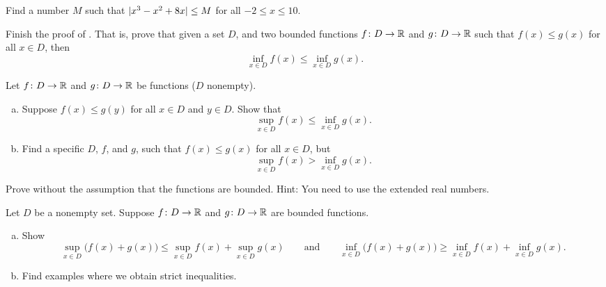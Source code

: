 \begin{exercise}
Find a number $M$ such that $\lvert {x^3-x^2+8x} \rvert \leq M$ for all $-2 \leq x \leq
10$.
\end{exercise}

\begin{exercise} \label{exercise:finishfuncsupinf}
Finish the proof of .
That is, prove that
given a set $D$,
and two bounded functions
$f \colon D \to {\mathbb{R}}$ and $g \colon D \to {\mathbb{R}}$ 
such that $f(x) \leq g(x)$ for all $x \in D$, then 
\begin{equation*}
\inf_{x\in D} f(x) \leq \inf_{x\in D} g(x) .
\end{equation*}
\end{exercise}

\begin{exercise} \label{exercise:supinffuncineq}
Let 
$f \colon D \to {\mathbb{R}}$ and $g \colon D \to {\mathbb{R}}$ be functions ($D$ nonempty).
\begin{enumerate}[a)]
%
\item
Suppose 
$f(x) \leq g(y)$ for all $x \in D$ and $y \in D$.  Show that
\begin{equation*}
\sup_{x\in D} f(x) \leq \inf_{x\in D} g(x) .
\end{equation*}
%
\item
Find a specific $D$, $f$, and $g$, such that
$f(x) \leq g(x)$ for all $x \in D$, but
\begin{equation*}
\sup_{x\in D} f(x) > \inf_{x\in D} g(x) .
\end{equation*}
\end{enumerate}
\end{exercise}

\begin{exercise}
Prove  without the assumption that
the functions are bounded.  Hint: You need to use the extended real
numbers.
\end{exercise}

\begin{exercise} \label{exercise:sumofsup}
Let $D$ be a nonempty set.
Suppose $f \colon D \to {\mathbb{R}}$ and $g \colon D \to {\mathbb{R}}$ are bounded functions.
\begin{enumerate}[a)]
\item
Show 
\begin{equation*}
\sup_{x\in D} \bigl(f(x) + g(x) \bigr) \leq
\sup_{x\in D} f(x)
+
\sup_{x\in D} g(x)
\qquad \text{and} \qquad
\inf_{x\in D} \bigl(f(x) + g(x) \bigr) \geq
\inf_{x\in D} f(x)
+
\inf_{x\in D} g(x) .
\end{equation*}
\item
Find examples where we obtain strict inequalities.
\end{enumerate}
\end{exercise}

